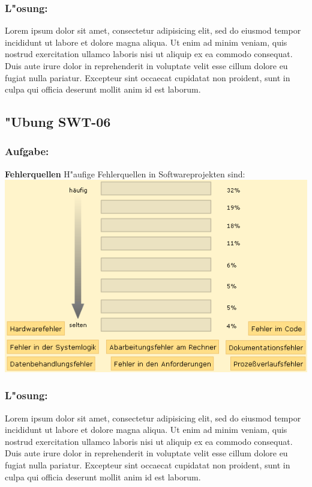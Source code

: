 \subsubsection*{L"osung:}
Lorem ipsum dolor sit amet, consectetur adipisicing elit, sed do eiusmod tempor incididunt ut labore et dolore magna aliqua. Ut enim ad minim veniam, quis nostrud exercitation ullamco laboris nisi ut aliquip ex ea commodo consequat. Duis aute irure dolor in reprehenderit in voluptate velit esse cillum dolore eu fugiat nulla pariatur. Excepteur sint occaecat cupidatat non proident, sunt in culpa qui officia deserunt mollit anim id est laborum.

\newpage
\subsection{"Ubung SWT-06}
\subsubsection*{Aufgabe:}

\begin{framed}
\textbf{Fehlerquellen}
\smallbreak
H"aufige Fehlerquellen in Softwareprojekten sind:
\bigbreak
\includegraphics[width=1.0\textwidth]{./images/ueb01-06.png}
\end{framed}
\bigbreak
\bigbreak
\subsubsection*{L"osung:}
Lorem ipsum dolor sit amet, consectetur adipisicing elit, sed do eiusmod tempor incididunt ut labore et dolore magna aliqua. Ut enim ad minim veniam, quis nostrud exercitation ullamco laboris nisi ut aliquip ex ea commodo consequat. Duis aute irure dolor in reprehenderit in voluptate velit esse cillum dolore eu fugiat nulla pariatur. Excepteur sint occaecat cupidatat non proident, sunt in culpa qui officia deserunt mollit anim id est laborum.


